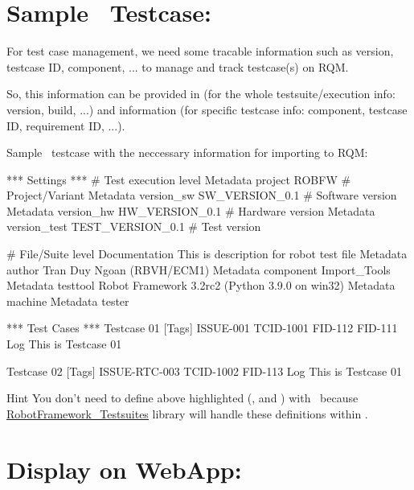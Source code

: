 \hypertarget{description-sample-robotframework-testcase}{%
\section{Sample \rfwcore\ Testcase:}
\label{description-sample-robotframework-testcase}}

For test case management, we need some tracable information such as
version, testcase ID, component, ... to manage and track testcase(s) on
RQM.

So, this information can be provided in  (for the whole
testsuite/execution info: version, build, ...) and \rcode{{[}Tags{]}}
information (for specific testcase info: component, testcase ID,
requirement ID, ...).

Sample \rfwcore\ testcase with the neccessary information for importing to
RQM:

\begin{robotcode}[caption=Sample \rfwcore\ testcase,
                  linebackgroundcolor=\hlcode{12,13,14}]
*** Settings ***
# Test execution level
Metadata   project        ROBFW              # Project/Variant
Metadata   version_sw     SW_VERSION_0.1     # Software version
Metadata   version_hw     HW_VERSION_0.1     # Hardware version
Metadata   version_test   TEST_VERSION_0.1   # Test version

# File/Suite level
Documentation             This is description for robot test file
Metadata    author        Tran Duy Ngoan (RBVH/ECM1)
Metadata    component     Import_Tools
Metadata    testtool      Robot Framework 3.2rc2 (Python 3.9.0 on win32)
Metadata    machine       %
Metadata    tester        %

*** Test Cases ***
Testcase 01
   [Tags]   ISSUE-001   TCID-1001   FID-112   FID-111
   Log       This is Testcase 01

Testcase 02
   [Tags]   ISSUE-RTC-003   TCID-1002   FID-113
   Log       This is Testcase 01
\end{robotcode}

\begin{boxhint} {Hint}
You don't need to define above highlighted (,
 and ) with \rfw\ because 
\href{https://github.com/test-fullautomation/robotframework-testsuitesmanagement}{RobotFramework\_Testsuites}
library will handle these definitions within .
\end{boxhint}

\newpage
\hypertarget{description-display-on-webapp}{%
\section{Display on WebApp:}\label{description-display-on-webapp}}

